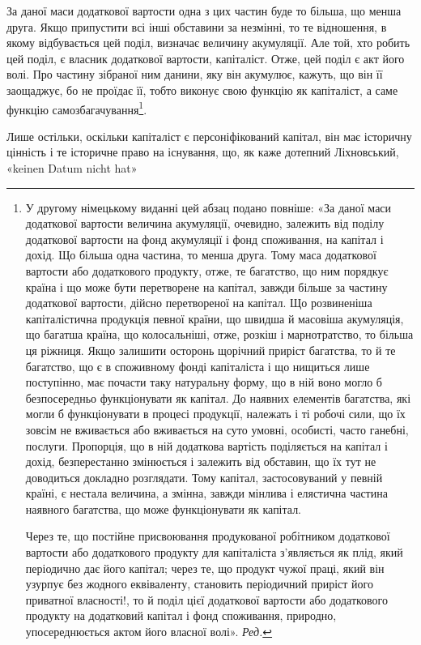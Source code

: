 За даної маси додаткової вартости одна з цих частин буде то
більша, що менша друга. Якщо припустити всі інші обставини
за незмінні, то те відношення, в якому відбувається цей поділ,
визначає величину акумуляції. Але той, хто робить цей поділ,
є власник додаткової вартости, капіталіст. Отже, цей поділ є
акт його волі. Про частину зібраної ним данини, яку він акумулює,
кажуть, що він її заощаджує, бо не проїдає її, тобто виконує
свою функцію як капіталіст, а саме функцію самозбагачування\footnote*{
У другому німецькому виданні цей абзац подано повніше: «За
даної маси додаткової вартости величина акумуляції, очевидно, залежить
від поділу додаткової вартости на фонд акумуляції і фонд споживання,
на капітал і дохід. Що більша одна частина, то менша друга. Тому маса
додаткової вартости або додаткового продукту, отже, те багатство, що
ним порядкує країна і що може бути перетворене на капітал, завжди
більше за частину додаткової вартости, дійсно перетвореної на капітал.
Що розвиненіша капіталістична продукція певної країни, що швидша
й масовіша акумуляція, що багатша країна, що колосальніші, отже,
розкіш і марнотратство, то більша ця ріжниця. Якщо залишити осторонь
щорічний приріст багатства, то й те багатство, що є в споживному фонді
капіталіста і що нищиться лише поступінно, має почасти таку натуральну
форму, що в ній воно могло б безпосередньо функціонувати як капітал.
До наявних елементів багатства, які могли б функціонувати в процесі
продукції, належать і ті робочі сили, що їх зовсім не вживається або вживається
на суто умовні, особисті, часто ганебні, послуги. Пропорція, що
в ній додаткова вартість поділяється на капітал і дохід, безперестанно
змінюється і залежить від обставин, що їх тут не доводиться докладно
розглядати. Тому капітал, застосовуваний у певній країні, є нестала
величина, а змінна, завжди мінлива і елястична частина наявного багатства,
що може функціонувати як капітал.

Через те, що постійне присвоювання продукованої робітником додаткової
вартости або додаткового продукту для капіталіста з’являється
як плід, який періодично дає його капітал; через те, що продукт чужої
праці, який він узурпує без жодного еквіваленту, становить періодичний
приріст його приватної власності!, то й поділ цієї додаткової вартости або
додаткового продукту на додатковий капітал і фонд споживання, природно,
упосереднюється актом його власної волі». \emph{Ред.}
}.

Лише остільки, оскільки капіталіст є персоніфікований капітал,
він має історичну цінність і те історичне право на існування,
що, як каже дотепний Ліхновський, «keinen Datum nicht hat»
\parbreak{}  %
